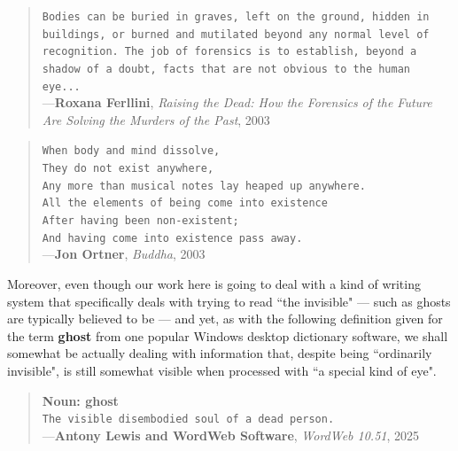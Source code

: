 \documentclass[a4paper, 18pt]{book} %
\begin{document}
{{{\begin{quotation}
\noindent \texttt{Bodies can be buried in graves, left on the ground, hidden in buildings, or burned and mutilated beyond any normal level of recognition. The job of forensics is to establish, beyond a shadow of a doubt, facts that are not obvious to the human eye...}\\
\hspace*{\fill} ---\textbf{Roxana Ferllini}, \textit{Raising the Dead: How the Forensics of the Future Are Solving the Murders of the Past}, 2003\cite{Ferllini2003}
\end{quotation}


\vspace{2em}

\begin{quotation}
\noindent \texttt{When body and mind dissolve,}\\\texttt{They do not exist anywhere,}\\\texttt{Any more than musical notes lay heaped up anywhere.}\\\texttt{All the elements of being come into existence}\\\texttt{After having been non-existent;}\\\texttt{And having come into existence pass away.}\\
\hspace*{\fill} ---\textbf{Jon Ortner}, \textit{Buddha}, 2003\cite{Ortner2003}
\end{quotation}


\vspace{2em}

Moreover, even though our work here is going to deal with a kind of writing system that specifically deals with trying to read ``the invisible" --- such as ghosts are typically believed to be --- and yet, as with the following definition given for the term \textbf{ghost} from one popular Windows desktop dictionary software, we shall somewhat be actually dealing with information that, despite being ``ordinarily invisible", is still somewhat visible when processed with ``a special kind of eye".



\vspace{2em}

\begin{quotation}
\noindent \textbf{Noun: ghost}\\\texttt{The visible disembodied soul of a dead person.}\\
\hspace*{\fill} ---\textbf{Antony Lewis and WordWeb Software}, \textit{WordWeb 10.51}, 2025\cite{WordWeb2025}
\end{quotation}


}}}
\end{document}
